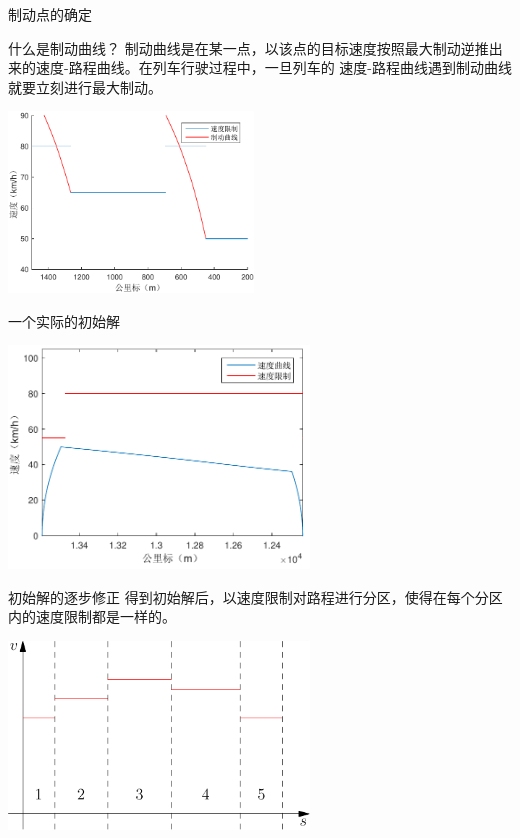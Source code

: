 \documentclass{beamer}
\begin{document}
\begin{frame}{制动点的确定}
\begin{block}{什么是制动曲线？}
制动曲线是在某一点，以该点的目标速度按照最大制动逆推出来的速度-路程曲线。在列车行驶过程中，一旦列车的
速度-路程曲线遇到制动曲线就要立刻进行最大制动。
\end{block}

\begin{center}
\includegraphics[width=6.5cm]{fig/fig6/fig6.pdf}
\end{center}
\end{frame}

\begin{frame}{一个实际的初始解}
\begin{center}
\includegraphics[width=8cm]{fig/fig7/fig7.pdf}
\end{center}
\end{frame}

\begin{frame}{初始解的逐步修正}
得到初始解后，以速度限制对路程进行分区，使得在每个分区内的速度限制都是一样的。

\begin{center}
\includegraphics[width=8cm]{fig/fig8/fig8.pdf}
\end{center}
\end{frame}
\end{document}

